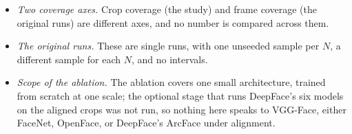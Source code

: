 \begin{itemize}
\item \textit{Two coverage axes.} Crop coverage (the study) and frame coverage (the original runs) are different axes, and no number is compared across them.
\item \textit{The original runs.} These are single runs, with one unseeded sample per $N$, a different sample for each $N$, and no intervals.
\item \textit{Scope of the ablation.} The ablation covers one small architecture, trained from scratch at one scale; the optional stage that runs DeepFace's six models on the aligned crops was not run, so nothing here speaks to VGG-Face, either FaceNet, OpenFace, or DeepFace's ArcFace under alignment.
\end{itemize}
